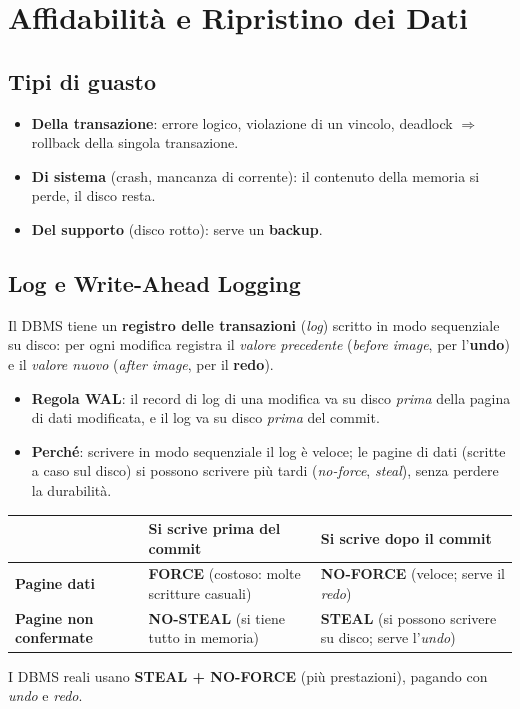\section{Affidabilità e Ripristino dei Dati}

\subsection{Tipi di guasto}
\begin{itemize}
    \item \textbf{Della transazione}: errore logico, violazione di un vincolo, deadlock $\Rightarrow$ rollback della singola transazione.
    \item \textbf{Di sistema} (crash, mancanza di corrente): il contenuto della memoria si perde, il disco resta.
    \item \textbf{Del supporto} (disco rotto): serve un \textbf{backup}.
\end{itemize}

\subsection{Log e Write-Ahead Logging}
Il DBMS tiene un \textbf{registro delle transazioni} (\emph{log}) scritto in modo sequenziale su disco: per ogni modifica registra il \emph{valore precedente} (\emph{before image}, per l'\textbf{undo}) e il \emph{valore nuovo} (\emph{after image}, per il \textbf{redo}).
\begin{itemize}
    \item \textbf{Regola WAL}: il record di log di una modifica va su disco \emph{prima} della pagina di dati modificata, e il log va su disco \emph{prima} del commit.
    \item \textbf{Perché}: scrivere in modo sequenziale il log è veloce; le pagine di dati (scritte a caso sul disco) si possono scrivere più tardi (\emph{no-force}, \emph{steal}), senza perdere la durabilità.
\end{itemize}
\begin{center}
\small
\begin{tabularx}{\textwidth}{@{}>{\raggedright\arraybackslash}p{2.6cm}XX@{}}
\toprule
 & \textbf{Si scrive prima del commit} & \textbf{Si scrive dopo il commit} \\
\midrule
\textbf{Pagine dati} & \textbf{FORCE} (costoso: molte scritture casuali) & \textbf{NO-FORCE} (veloce; serve il \emph{redo}) \\
\textbf{Pagine non confermate} & \textbf{NO-STEAL} (si tiene tutto in memoria) & \textbf{STEAL} (si possono scrivere su disco; serve l'\emph{undo}) \\
\bottomrule
\end{tabularx}
\end{center}
I DBMS reali usano \textbf{STEAL + NO-FORCE} (più prestazioni), pagando con \emph{undo} e \emph{redo}.

